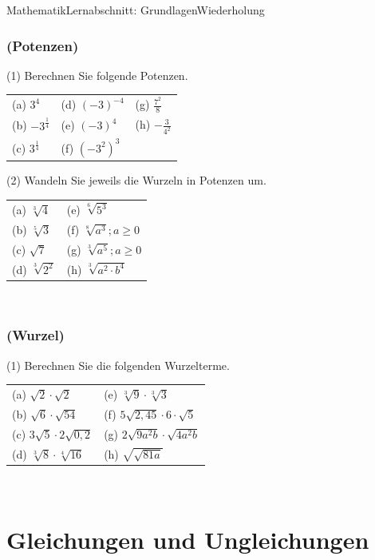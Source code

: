 \documentclass[11pt,twocolumn,oneside,openany,headings=optiontotoc,11pt,numbers=noenddot]{article}
\begin{document}
\begin{worksheet}{Mathematik}{Lernabschnitt: Grundlagen}{Wiederholung}
		\subsubsection*{(Potenzen)}
		(1) Berechnen Sie folgende Potenzen.
		\begin{tabularx}{0.5\textwidth}{XXX}
			(a) \(3^4\) & (d) \((-3)^{-4}\) & (g) \(\frac{7^2}{8}\)\\
			(b) \(-3^{\frac{1}{4}}\) & (e) \((-3)^4\) & (h) \(-\frac{3}{4^2}\)\\
			(c) \(3^{\frac{1}{4}}\) & (f) \((-3^2)^3\)
		\end{tabularx}
		\par\bigskip\noindent
		(2) Wandeln Sie jeweils die Wurzeln in Potenzen um.
		\begin{tabularx}{0.5\textwidth}{XX}
			(a) \(\sqrt[3]{4}\) & (e) \(\sqrt[6]{5^3}\)\\
			(b) \(\sqrt[5]{3}\) & (f) \(\sqrt[8]{a^3}; a\geq 0\)\\
			(c) \(\sqrt{7}\) & (g) \(\sqrt[3]{a^5}; a\geq 0\)\\
			(d) \(\sqrt[3]{2^2}\) & (h) \(\sqrt[3]{a^2\cdot{}b^4}\)
		\end{tabularx}\\
		\subsubsection*{(Wurzel)}
		(1) Berechnen Sie die folgenden Wurzelterme.
		\begin{tabularx}{0.5\textwidth}{XX}
			(a) \(\sqrt{2}\cdot\sqrt{2}\) & (e) \(\sqrt[3]{9}\cdot\sqrt[3]{3}\)\\
			(b) \(\sqrt{6}\cdot\sqrt{54}\) & (f) \(5\sqrt{2,45}\cdot{}6\cdot\sqrt{5}\)\\
			(c) \(3\sqrt{5}\cdot{}2\sqrt{0,2}\) & (g) \(2\sqrt{9a^2b}\cdot\sqrt{4a^2b}\)\\
			(d) \(\sqrt[3]{8}\cdot\sqrt[4]{16}\) & (h) \(\sqrt{\sqrt{81a}}\)
		\end{tabularx}\\
		\newpage
		\section{Gleichungen und Ungleichungen}

\end{worksheet}
\end{document}
